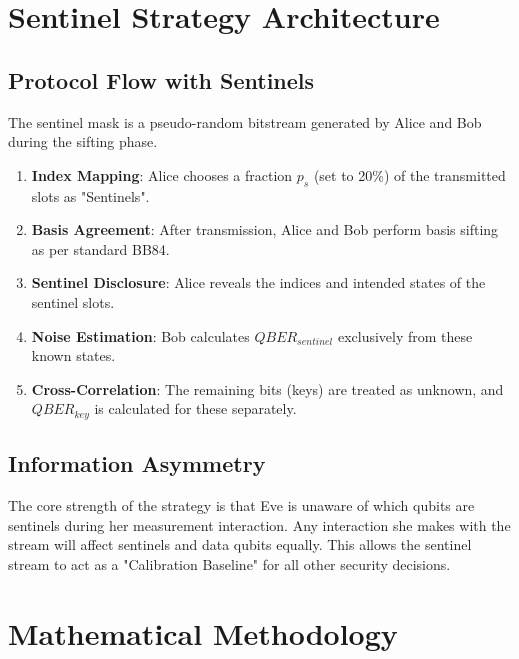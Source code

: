 \documentclass[journal,onecolumn,12pt,draftclsnofoot]{IEEEtran}
\begin{document}
\newpage

\section{Sentinel Strategy Architecture}

\subsection{Protocol Flow with Sentinels}
The sentinel mask is a pseudo-random bitstream generated by Alice and Bob during the sifting phase.
\begin{enumerate}
    \item \textbf{Index Mapping}: Alice chooses a fraction $p_s$ (set to 20\%) of the transmitted slots as "Sentinels".
    \item \textbf{Basis Agreement}: After transmission, Alice and Bob perform basis sifting as per standard BB84.
    \item \textbf{Sentinel Disclosure}: Alice reveals the indices and intended states of the sentinel slots.
    \item \textbf{Noise Estimation}: Bob calculates $QBER_{sentinel}$ exclusively from these known states.
    \item \textbf{Cross-Correlation}: The remaining bits (keys) are treated as unknown, and $QBER_{key}$ is calculated for these separately.
\end{enumerate}

\subsection{Information Asymmetry}
The core strength of the strategy is that Eve is unaware of which qubits are sentinels during her measurement interaction. Any interaction she makes with the stream will affect sentinels and data qubits equally. This allows the sentinel stream to act as a "Calibration Baseline" for all other security decisions.

\newpage

\section{Mathematical Methodology}
\end{document}
